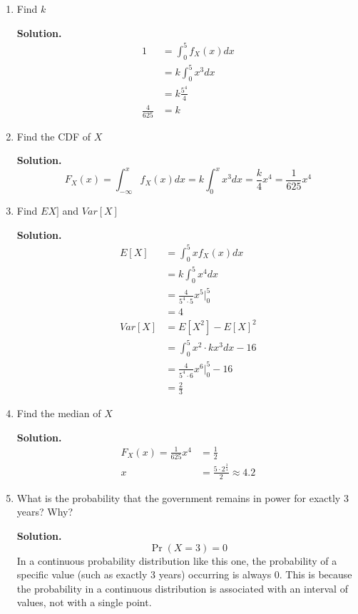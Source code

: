 \documentclass[12pt]{article}
\begin{document}
\begin{enumerate}
    \item Find $k$

    \textbf{Solution.} 
    \begin{align*}
        1 &= \int_0^5 f_X(x)dx 
        \\ &= k\int_0^5 x^3dx
        \\ &= k \frac{5^4}{4}
        \\ \frac{4}{625} &= k
    \end{align*}

    \item Find the CDF of $X$

    \textbf{Solution.} 
    \[ F_X(x) = \int_{-\infty}^x f_X(x) dx = k\int_0^x x^3dx = \frac{k}{4}x^4 = \frac{1}{625}x^4\]

    \item Find $EX]$ and $Var[X]$

    \textbf{Solution.}
    \begin{align*}
        E[X] &= \int_0^5 xf_X(x)dx 
        \\ &= k\int_0^5 x^4 dx 
        \\ &= \frac{4}{5^4 \cdot 5}x^5 \bigg|_0^5 
        \\ &= 4
        \\ Var[X] &= E[X^2] - E[X]^2 
        \\ &= \int_0^5 x^2 \cdot kx^3 dx - 16 
        \\ &= \frac{4}{5^4\cdot 6}x^6 \bigg|_0^5 -16
        \\ &= \frac{2}{3}
    \end{align*}

    \item Find the median of $X$

    \textbf{Solution.}
    \begin{align*}
        F_X(x) = \frac{1}{625}x^4 &= \frac{1}{2}
        \\ x &= \frac{5\cdot 2^{\frac{3}{4}}}{2} \approx 4.2
    \end{align*}

    \item What is the probability that the government remains in power for exactly 3 years? Why?
    
        \textbf{Solution.}
        \[ \Pr(X=3) = 0\]
        In a continuous probability distribution like this one, the probability of a specific value (such as exactly 3 years) occurring is always 0. This is because the probability in a continuous distribution is associated with an interval of values, not with a single point.


\end{enumerate}
\end{document}
